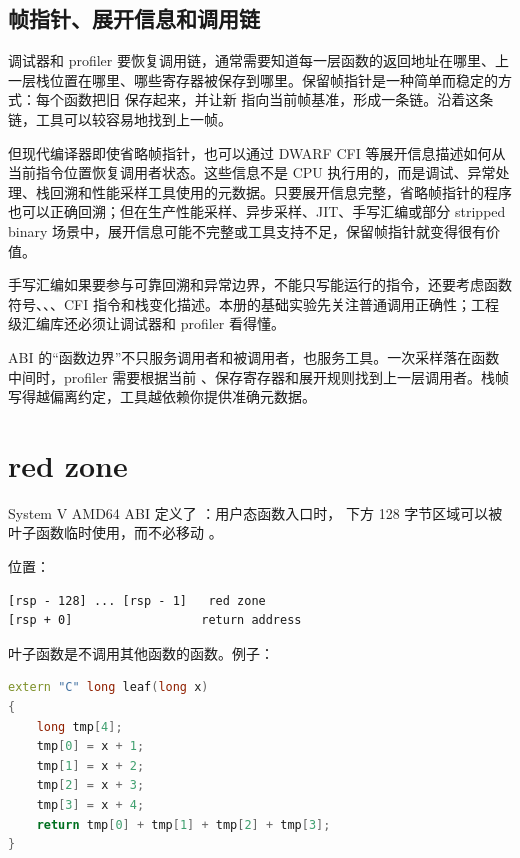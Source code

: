 \subsection{帧指针、展开信息和调用链}

调试器和 profiler 要恢复调用链，通常需要知道每一层函数的返回地址在哪里、上一层栈位置在哪里、哪些寄存器被保存到哪里。保留帧指针是一种简单而稳定的方式：每个函数把旧  保存起来，并让新  指向当前帧基准，形成一条链。沿着这条链，工具可以较容易地找到上一帧。

但现代编译器即使省略帧指针，也可以通过 DWARF CFI 等展开信息描述如何从当前指令位置恢复调用者状态。这些信息不是 CPU 执行用的，而是调试、异常处理、栈回溯和性能采样工具使用的元数据。只要展开信息完整，省略帧指针的程序也可以正确回溯；但在生产性能采样、异步采样、JIT、手写汇编或部分 stripped binary 场景中，展开信息可能不完整或工具支持不足，保留帧指针就变得很有价值。

手写汇编如果要参与可靠回溯和异常边界，不能只写能运行的指令，还要考虑函数符号、、、CFI 指令和栈变化描述。本册的基础实验先关注普通调用正确性；工程级汇编库还必须让调试器和 profiler 看得懂。

\begin{deepdive}
ABI 的“函数边界”不只服务调用者和被调用者，也服务工具。一次采样落在函数中间时，profiler 需要根据当前 、保存寄存器和展开规则找到上一层调用者。栈帧写得越偏离约定，工具越依赖你提供准确元数据。
\end{deepdive}

\section{red zone}

System V AMD64 ABI 定义了 ：用户态函数入口时， 下方 128 字节区域可以被叶子函数临时使用，而不必移动 。

位置：

\begin{lstlisting}
[rsp - 128] ... [rsp - 1]   red zone
[rsp + 0]                  return address
\end{lstlisting}

叶子函数是不调用其他函数的函数。例子：

\begin{lstlisting}[language=C++]
extern "C" long leaf(long x)
{
    long tmp[4];
    tmp[0] = x + 1;
    tmp[1] = x + 2;
    tmp[2] = x + 3;
    tmp[3] = x + 4;
    return tmp[0] + tmp[1] + tmp[2] + tmp[3];
}
\end{lstlisting}

